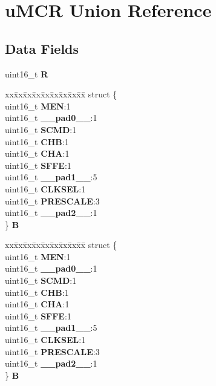 \hypertarget{unionuMCR}{}\section{u\+M\+CR Union Reference}
\label{unionuMCR}
\subsection*{Data Fields}
\begin{DoxyCompactItemize}
\item 
\mbox{\label{unionuMCR_a82bbaf9a74b4727abab993b8748c8108}} 
uint16\+\_\+t {\bfseries R}
\item 
\mbox{\label{unionuMCR_ad616f207ae66ee17ba5759ab931add77}} 
\begin{tabbing}
xx\=xx\=xx\=xx\=xx\=xx\=xx\=xx\=xx\=\kill
struct \{\\
\>uint16\_t {\bfseries MEN}:1\\
\>uint16\_t {\bfseries \_\_pad0\_\_}:1\\
\>uint16\_t {\bfseries SCMD}:1\\
\>uint16\_t {\bfseries CHB}:1\\
\>uint16\_t {\bfseries CHA}:1\\
\>uint16\_t {\bfseries SFFE}:1\\
\>uint16\_t {\bfseries \_\_pad1\_\_}:5\\
\>uint16\_t {\bfseries CLKSEL}:1\\
\>uint16\_t {\bfseries PRESCALE}:3\\
\>uint16\_t {\bfseries \_\_pad2\_\_}:1\\
\} {\bfseries B}\\

\end{tabbing}\item 
\mbox{\label{unionuMCR_a1aae1a0c7fbeeb71505922b1ed6c86d9}} 
\begin{tabbing}
xx\=xx\=xx\=xx\=xx\=xx\=xx\=xx\=xx\=\kill
struct \{\\
\>uint16\_t {\bfseries MEN}:1\\
\>uint16\_t {\bfseries \_\_pad0\_\_}:1\\
\>uint16\_t {\bfseries SCMD}:1\\
\>uint16\_t {\bfseries CHB}:1\\
\>uint16\_t {\bfseries CHA}:1\\
\>uint16\_t {\bfseries SFFE}:1\\
\>uint16\_t {\bfseries \_\_pad1\_\_}:5\\
\>uint16\_t {\bfseries CLKSEL}:1\\
\>uint16\_t {\bfseries PRESCALE}:3\\
\>uint16\_t {\bfseries \_\_pad2\_\_}:1\\
\} {\bfseries B}\\


\end{tabbing}
\end{DoxyCompactItemize}
